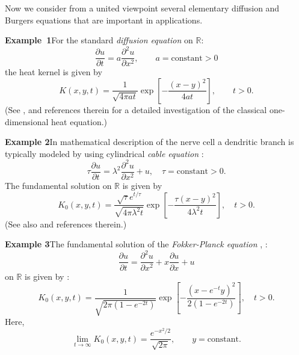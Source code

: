 \documentclass[12pt,reqno]{amsart}
\theoremstyle{plain}
\numberwithin{equation}{section}
\begin{document}
Now we consider from a united viewpoint several elementary diffusion and
Burgers equations that are important in applications.

\bigskip

\textbf{Example~1\quad }For the standard \textit{diffusion equation} on $\mathbb{R}
:$\begin{equation}
\frac{\partial u}{\partial t}=a\frac{\partial ^{2}u}{\partial x^{2}},\qquad
a=\text{constant}>0  \label{sp1}
\end{equation}the heat kernel is given by\begin{equation}
K\left( x,y,t\right) =\frac{1}{\sqrt{4\pi at}}\exp \left[ -\frac{\left(
x-y\right) ^{2}}{4at}\right] ,\qquad t>0.  \label{sp2}
\end{equation}(See \cite{Cann}, \cite{NiPDE} and references therein for a detailed
investigation of the classical one-dimensional heat equation.)

\bigskip

\textbf{Example 2\quad }In mathematical description of the nerve cell a
dendritic branch is typically modeled by using cylindrical \textit{cable
equation} \cite{JackNobleTsien83}:\begin{equation}
\tau \frac{\partial u}{\partial t}=\lambda ^{2}\frac{\partial ^{2}u}{\partial x^{2}}+u,\quad \tau =\text{constant}>0.  \label{sp3}
\end{equation}The fundamental solution on $\mathbb{R}
$ is given by\begin{equation}
K_{0}\left( x,y,t\right) =\frac{\sqrt{\tau }e^{t/\tau }}{\sqrt{4\pi \lambda
^{2}t}}\exp \left[ -\frac{\tau \left( x-y\right) ^{2}}{4\lambda ^{2}t}\right]
,\quad t>0.  \label{sp4}
\end{equation}(See also \cite{Herr-Val:Sus} and references therein.)

\bigskip

\textbf{Example 3\quad }The fundamental solution of the \textit{Fokker-Planck equation }\cite{Risken89}, \cite{Yau04}: 
\begin{equation}
\frac{\partial u}{\partial t}=\frac{\partial ^{2}u}{\partial x^{2}}+x\frac{\partial u}{\partial x}+u  \label{sp5}
\end{equation}on $\mathbb{R}
$ is given by \cite{SuazoSusVega10}:\begin{equation}
K_{0}\left( x,y,t\right) =\frac{1}{\sqrt{2\pi \left( 1-e^{-2t}\right) }}\exp \left[ -\frac{\left( x-e^{-t}y\right) ^{2}}{2\left( 1-e^{-2t}\right) }\right]
,\quad t>0.  \label{sp6}
\end{equation}Here, 
\begin{equation}
\lim_{t\rightarrow \infty }K_{0}\left( x,y,t\right) =\frac{e^{-x^{2}/2}}{\sqrt{2\pi }},\qquad y=\text{constant}.  \label{FPLimit}
\end{equation}
\end{document}
